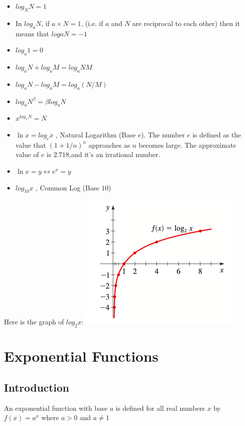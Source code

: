 \documentclass{book}
\begin{document}
	\begin{itemize}
		\item $log_NN = 1$
		\item In $log_aN$, if $a \times N =1$, (i.e. if $a$ and $N$ are reciprocal to each other) then it means that $logaN = -1$ 
		\item $log_a1 = 0$
		\item $log_aN + log_aM = log_a{NM}$
		\item $log_aN - log_aM = log_a{(N/M)}$
		\item $log_aN^\beta = \beta log_aN$
		\item$x^{log_xN} = N$
		\item $\ln x = log_ex$ , Natural Logarithm (Base $e$). The number $e$ is defined as the value that $(1 + 1/n)^n$ approaches as $n$ becomes large. The approximate value of $e$ is $2.718$,and it's an irrational number.
		\item $\ln x = y \leftrightarrow e^x = y$
		\item $log_{10}x$ , Common Log (Base $10$)
	\end{itemize}
	
	Here is the graph of $log_2x$: 
	\includegraphics[scale=0.6]{loggraph}

	\chapter{Exponential Functions}
	
	\section{Introduction}
	\begin{mdframed}[backgroundcolor=yellow]
		An exponential function with base $a$ is defined for all real numbers $x$ by $f(x) = a^x$ where $a>0$ and $a \neq 1$
	\end{mdframed}
	
\end{document}
